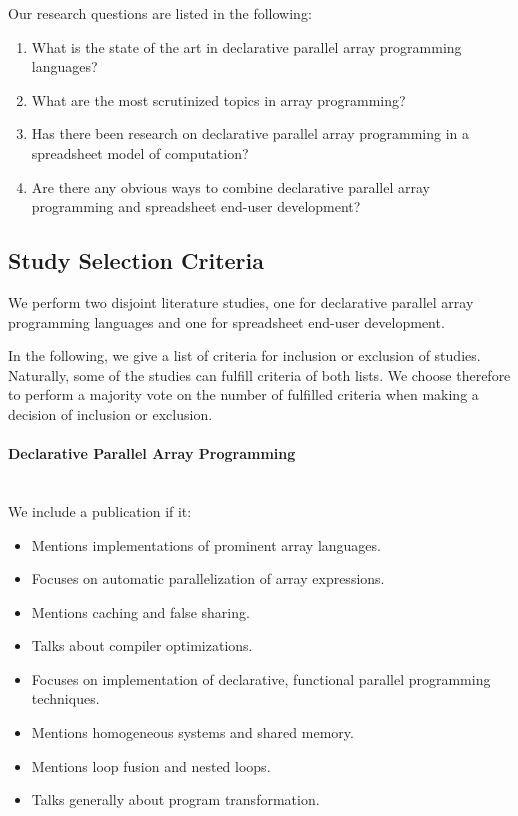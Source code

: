 \documentclass[a4paper]{article}
\begin{document}
Our research questions are listed in the following:

\begin{enumerate}
\item What is the state of the art in declarative parallel array
  programming languages?
\item What are the most scrutinized topics in array programming?
\item Has there been research on declarative parallel array
  programming in a spreadsheet model of computation?
\item Are there any obvious ways to combine declarative parallel array
  programming and spreadsheet end-user development?
\end{enumerate}

\subsection{Study Selection Criteria}
\label{sec:study-select-crit}

We perform two disjoint literature studies, one for declarative
parallel array programming languages and one for spreadsheet end-user
development.

In the following, we give a list of criteria for inclusion or
exclusion of studies. Naturally, some of the studies can fulfill
criteria of both lists. We choose therefore to perform a majority vote
on the number of fulfilled criteria when making a decision of
inclusion or exclusion.

\paragraph{Declarative Parallel Array Programming}
~\\

We include a publication if it:

\begin{itemize}
\item Mentions implementations of prominent array languages.
\item Focuses on automatic parallelization of array expressions.
\item Mentions caching and false sharing.
\item Talks about compiler optimizations.
\item Focuses on implementation of declarative, functional parallel
  programming techniques.
\item Mentions homogeneous systems and shared memory.
\item Mentions loop fusion and nested loops.
\item Talks generally about program transformation.
\end{itemize}
\end{document}
